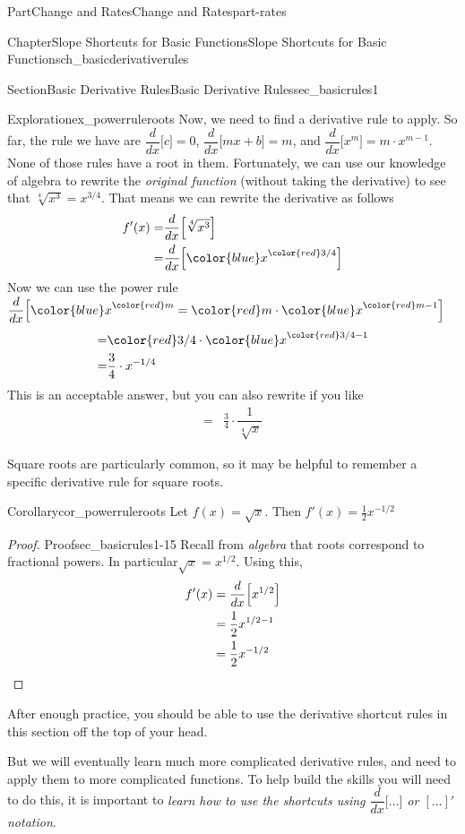\documentclass[oneside,10pt,]{tufte-book}
\numberwithin{equation}{chapter}
\newcommand{\qedhere}{\relax}
\newcommand{\ddx}[1]{ \dfrac{d}{dx} \Big[ #1 \Big]  }
\newcommand{\amp}{&}
\begin{document}
\begin{partptx}{Part}{Change and Rates}{}{Change and Rates}{}{}{part-rates}
\begin{chapterptx}{Chapter}{Slope Shortcuts for Basic Functions}{}{Slope Shortcuts for Basic Functions}{}{}{ch_basicderivativerules}
\begin{sectionptx}{Section}{Basic Derivative Rules}{}{Basic Derivative Rules}{}{}{sec_basicrules1}
\begin{exploration}{Exploration}{}{ex_powerruleroots}
Now, we need to find a derivative rule to apply. So far, the rule we have are \(\ddx{c} = 0\), \(\ddx{mx+b} = m\), and \(\ddx{x^m} = m\cdot x^{m-1}\). None of those rules have a root in them.  Fortunately, we can use our knowledge of algebra to rewrite the \emph{original function} (without taking the derivative) to see that \(\sqrt[4]{x^3} = x^{3/4}\).  That means we can rewrite the derivative as follows%
\begin{align*}
f'(x) = \amp \dfrac{d}{dx}\Big[  \sqrt[4]{x^3} \Big] \\
=  \amp \dfrac{d}{dx}\Big[  {\color{blue} x}^{\color{red} 3/4}  \Big]
\end{align*}
Now we can use the power rule \(\dfrac{d}{dx}\Big[   {\color{blue} x}^{\color{red} m}= {\color{red} m}\cdot {\color{blue} x}^{{\color{red} m}-1} \Big] \)%
\begin{align*}
= \amp {\color{red} 3/4} \cdot {\color{blue} x}^{{\color{red} 3/4}-1} \\
= \amp \frac{3}{4} \cdot x^{-1/4} 
\end{align*}
This is an acceptable answer, but you can also rewrite if you like%
\begin{align*}
= \amp \frac{3}{4} \cdot \dfrac{1}{\sqrt[4]{x}} 
\end{align*}
%
\end{exploration}%
Square roots are particularly common, so it may be helpful to remember a specific derivative rule for square roots.%
\begin{corollary}{Corollary}{}{}{cor_powerruleroots}%
Let \(f(x) = \sqrt{x}\).  Then \(f'(x) = \frac{1}{2} x^{-1/2}\)%
\end{corollary}
\begin{proof}{Proof}{}{sec_basicrules1-15}
Recall from \emph{algebra} that roots correspond to fractional powers.  In particular\(\sqrt{x} = x^{1/2}\). Using this,%
\begin{align*}
f'(x) \amp = \ddx{x^{1/2}} \\
\amp = \frac{1}{2} x^{1/2 - 1}\\
\amp = \frac{1}{2} x^{-1/2}\qedhere
\end{align*}
%
\end{proof}
After enough practice, you should be able to use the derivative shortcut rules in this section off the top of your head.%
\par
But we will eventually learn much more complicated derivative rules, and need to apply them to more complicated functions.  To help build the skills you will need to do this, it is important to \emph{learn how to use the shortcuts using \(\dfrac{d}{dx}\Big[\dots\Big]\) or \([ \dots ]'\) notation}.%

\end{sectionptx}
\end{chapterptx}
\end{partptx}
\end{document}
